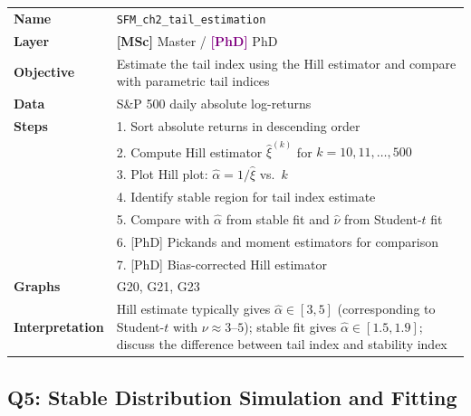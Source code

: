\documentclass[11pt, a4paper]{article}
\newcommand{\layerM}[1]{\textcolor{Forest}{\textbf{[MSc]}} #1}
\newcommand{\layerP}[1]{\textcolor{Purple}{\textbf{[PhD]}} #1}
\theoremstyle{definition}
\begin{document}
\begin{tabular}{l p{12cm}}
\toprule
\textbf{Name} & \texttt{SFM\_ch2\_tail\_estimation} \\
\textbf{Layer} & \layerM{Master} / \layerP{PhD} \\
\textbf{Objective} & Estimate the tail index using the Hill estimator and compare with parametric tail indices \\
\textbf{Data} & S\&P 500 daily absolute log-returns \\
\textbf{Steps} &
  1. Sort absolute returns in descending order \\
  & 2. Compute Hill estimator $\hat{\xi}^{(k)}$ for $k = 10, 11, \ldots, 500$ \\
  & 3. Plot Hill plot: $\hat{\alpha} = 1/\hat{\xi}$ vs.\ $k$ \\
  & 4. Identify stable region for tail index estimate \\
  & 5. Compare with $\hat{\alpha}$ from stable fit and $\hat{\nu}$ from Student-$t$ fit \\
  & 6. [PhD] Pickands and moment estimators for comparison \\
  & 7. [PhD] Bias-corrected Hill estimator \\
\textbf{Graphs} & G20, G21, G23 \\
\textbf{Interpretation} & Hill estimate typically gives $\hat{\alpha} \in [3, 5]$ (corresponding to Student-$t$ with $\nu \approx 3$--$5$); stable fit gives $\hat{\alpha} \in [1.5, 1.9]$; discuss the difference between tail index and stability index \\
\bottomrule
\end{tabular}

\subsection{Q5: Stable Distribution Simulation and Fitting}
\end{document}
